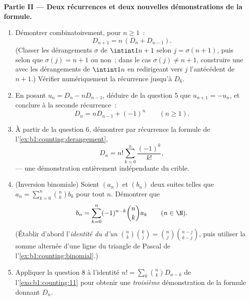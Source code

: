 \begin{problem}
\medskip
\noindent\textbf{Partie II --- Deux récurrences et deux nouvelles
démonstrations de la formule.}
\begin{enumerate}[resume]
  \item Démontrer combinatoirement, pour $n \geq 1$~:
        \[
        D_{n+1} = n\,(D_n + D_{n-1}) .
        \]
        (Classer les dérangements $\sigma$ de $\intint1{n+1}$ selon
        $j = \sigma(n+1)$, puis selon que $\sigma(j) = n + 1$ ou non~;
        dans le cas $\sigma(j) \neq n+1$, construire une  avec
        les dérangements de $\intint1n$ en redirigeant vers $j$
        l'antécédent de $n + 1$.) Vérifier numériquement la récurrence
        jusqu'à $D_6$.
  \item En posant $u_n = D_n - n D_{n-1}$, déduire de la question 5
        que $u_{n+1} = -u_n$, et conclure à la seconde récurrence~:
        \[
        D_n = n D_{n-1} + (-1)^n \qquad (n \geq 1).
        \]
  \item À partir de la question 6, démontrer par récurrence la formule
        de l'\cref{ex:b1:counting:derangement},
        \[
        D_n = n! \sum_{k=0}^{n} \frac{(-1)^k}{k!},
        \]
        --- une démonstration entièrement indépendante du crible.
  \item (Inversion binomiale) Soient $(a_n)$ et $(b_n)$ deux suites
        telles que $a_n = \sum_{k=0}^n \binom nk b_k$ pour tout $n$.
        Démontrer que
        \[
        b_n = \sum_{k=0}^{n} (-1)^{n-k} \binom nk a_k
        \qquad (n \in \N).
        \]
        (Établir d'abord l'\emph{identité du  d'un
        }
        $\binom nk \binom kj = \binom nj \binom{n-j}{k-j}$, puis
        utiliser la somme alternée d'une ligne du triangle de Pascal
        de l'\cref{ex:b1:counting:binomial}.)
  \item Appliquer la question 8 à l'identité $n! = \sum_k \binom nk
        D_{n-k}$ de l'\cref{exo:b1:counting:11} pour obtenir une
        \emph{troisième} démonstration de la formule donnant $D_n$.
\end{enumerate}


\end{problem}
